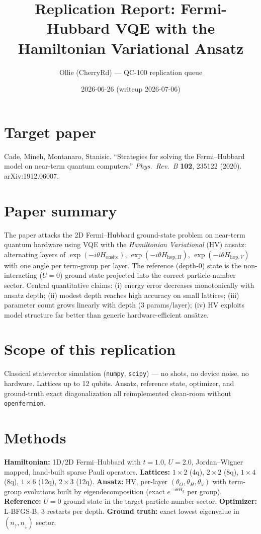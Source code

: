 \documentclass[11pt]{article}
\title{Replication Report: Fermi-Hubbard VQE with the Hamiltonian Variational Ansatz}
\author{Ollie (CherryRd) --- QC-100 replication queue}
\date{2026-06-26 (writeup 2026-07-06)}
\begin{document}
\maketitle

\section*{Target paper}
Cade, Mineh, Montanaro, Stanisic. ``Strategies for solving the Fermi--Hubbard
model on near-term quantum computers.'' \textit{Phys.\ Rev.\ B} \textbf{102},
235122 (2020). arXiv:1912.06007.

\section{Paper summary}
The paper attacks the 2D Fermi--Hubbard ground-state problem on near-term
quantum hardware using VQE with the \emph{Hamiltonian Variational} (HV) ansatz:
alternating layers of $\exp(-i\theta H_{\text{onsite}})$,
$\exp(-i\theta H_{\text{hop},H})$, $\exp(-i\theta H_{\text{hop},V})$ with one
angle per term-group per layer. The reference (depth-0) state is the
non-interacting ($U=0$) ground state projected into the correct particle-number
sector. Central quantitative claims: (i) energy error decreases monotonically
with ansatz depth; (ii) modest depth reaches high accuracy on small lattices;
(iii) parameter count grows linearly with depth (3 params/layer); (iv) HV
exploits model structure far better than generic hardware-efficient ans\"atze.

\section{Scope of this replication}
Classical statevector simulation (\texttt{numpy}, \texttt{scipy}) --- no shots,
no device noise, no hardware. Lattices up to 12 qubits. Ansatz, reference state,
optimizer, and ground-truth exact diagonalization all reimplemented clean-room
without \texttt{openfermion}.

\section{Methods}
\textbf{Hamiltonian:} 1D/2D Fermi--Hubbard with $t=1.0$, $U=2.0$, Jordan--Wigner
mapped, hand-built sparse Pauli operators. \textbf{Lattices:}
$1{\times}2$ (4q), $2{\times}2$ (8q), $1{\times}4$ (8q), $1{\times}6$ (12q),
$2{\times}3$ (12q). \textbf{Ansatz:} HV, per-layer $(\theta_O,\theta_H,\theta_V)$
with term-group evolutions built by eigendecomposition (exact
$e^{-i\theta H_g}$ per group). \textbf{Reference:} $U=0$ ground state in the
target particle-number sector. \textbf{Optimizer:} L-BFGS-B, 3 restarts per
depth. \textbf{Ground truth:} exact lowest eigenvalue in
$(n_\uparrow,n_\downarrow)$ sector.
\end{document}
